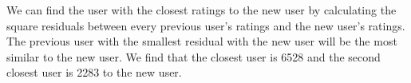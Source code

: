 \documentclass{article}
\begin{document}
\begin{homeworkProblem}

    We can find the user with the closest ratings to the new user by
    calculating the square residuals between every previous user's ratings and
    the new user's ratings. The previous user with the smallest residual with
    the new user will be the most similar to the new user. We find that the
    closest user is 6528 and the second closest user is 2283 to the new user.

\end{homeworkProblem}
\clearpage
\end{document}
